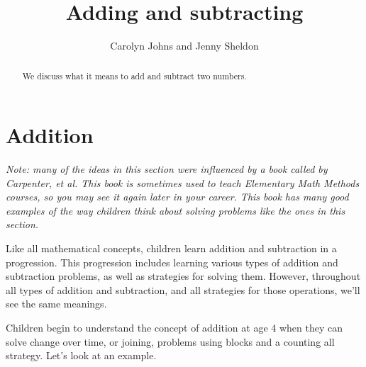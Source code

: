 \documentclass{ximera}
\title{Adding and subtracting}
\author{Carolyn Johns and Jenny Sheldon}
\begin{document}
\begin{abstract}
We discuss what it means to add and subtract two numbers.
\end{abstract}
\maketitle



\section{Addition}

\emph{Note: many of the ideas in this section were influenced by a book called  by Carpenter, et al. This book is sometimes used to teach Elementary Math Methods courses, so you may see it again later in your career. This book has many good examples of the way children think about solving problems like the ones in this section.}



Like all mathematical concepts, children learn addition and subtraction in a progression. This progression includes learning various types of addition and subtraction problems, as well as strategies for solving them. However, throughout all types of addition and subtraction, and all strategies for those operations, we'll see the same meanings.

Children begin to understand the concept of addition at age 4 when they can solve change over time, or joining, problems using blocks and a counting all strategy. Let's look at an example.
\end{document}
